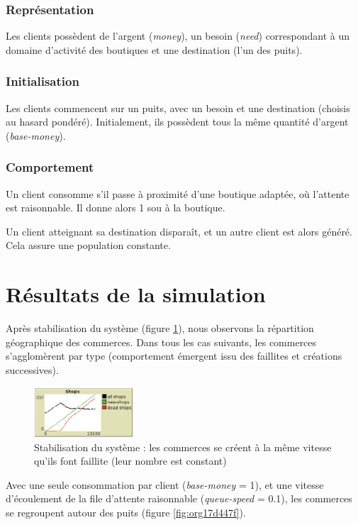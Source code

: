 \documentclass[11pt]{article}
\begin{document}
\subsubsection{Représentation}
\label{sec:orgc2882de}
Les clients possèdent de l'argent (\emph{money}), 
un besoin  (\emph{need}) correspondant à un domaine d'activité des boutiques
et une destination (l'un des puits).
\subsubsection{Initialisation}
\label{sec:org1807c5d}
Les clients commencent sur un puits, avec un besoin et une destination (choisis au hasard pondéré). 
Initialement, ils possèdent tous la même quantité d'argent (\emph{base-money}).
\subsubsection{Comportement}
\label{sec:orgb0e556f}
Un client consomme s'il passe à proximité d'une boutique
adaptée, où l'attente est raisonnable. Il donne alors 1 sou à la boutique.

Un client atteignant sa destination disparaît, et un autre client est alors généré.
Cela assure une population constante.

\section{Résultats de la simulation}
\label{sec:org8387a80}

Après stabilisation du système (figure \ref{fig:orgde578a5}), nous observons la répartition
géographique des commerces.
Dans tous les cas suivants, les commerces s'agglomèrent par type 
(comportement émergent issu des faillites et créations successives).


\begin{figure}[htbp]
\centering
\includegraphics[width=140px]{./images/shop_count.png}
\caption{\label{fig:orgde578a5}
Stabilisation du système : les commerces se créent à la même vitesse qu'ils font faillite (leur nombre est constant)}
\end{figure}

Avec une seule consommation par client (\emph{base-money} = 1), et une vitesse
d'écoulement de la file d'attente raisonnable (\emph{queue-speed} = 0.1), 
les commerces se regroupent autour des puits (figure \ref{fig:org17d447f}).
\end{document}
